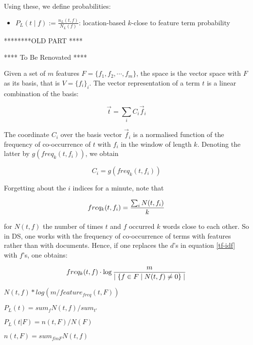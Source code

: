 Using  these, we define probabilities:

\begin{itemize}
\item $P_L(t \mid f) := \frac{n_L(t,f)}{N_L(f)}$: location-based $k$-close to feature term probability
\end{itemize}

********OLD PART ****

**** To Be Renovated ****

Given a set of $m$ features $F = \{f_1, f_2, \cdots, f_m\}$, the space is the vector space with $F$ as its basis, that is $V = \{f_i\}_i$. The vector representation of a term $t$ is a linear combination of the basis:

\begin{equation}
\label{vector-word}
\overrightarrow{t}  = \sum_i  C_i  \overrightarrow{f}_i
\end{equation}

The coordinate $C_i$ over the basis vector $\overrightarrow{f}_i$ is a normalised function of the frequency of co-occurrence of $t$ with $f_i$ in the window of length $k$. Denoting the latter by  $g(freq_k(t,f_i))$, we obtain 

\begin{equation}
C_i = g(freq_k(t,f_i))
\end{equation}

Forgetting about the $i$ indices for a minute, note that 

\begin{equation}
freq_k(t,f_i) = {{\sum_i N(t,f_i)} \over {k}}
\end{equation}

for $N(t, f)$ the number of times $t$ and $f$ occurred  $k$ words close to each other.  So in DS, one works with the frequency of co-occurrence of terms with features rather than with documents. Hence, if one replaces the $d$'s in equation \ref{tf-idf} with $f$'s, one obtains:

\begin{equation}
\label{f-for-d}
freq_k(t, f) \cdot \log{{m} \over {\mid \{f \in F \mid N(t,f)  \neq 0 \}\mid}}
\end{equation}


$N(t, f) * log ( m / feature_{freq} ( t, F ) )$


$P_L ( t ) = sum_f N( t, f)  /  sum_{ t' }$

$P_L ( t | F ) = n (t , F) / N ( F )$

$ n ( t , F ) = sum_{f in F} N(t, f)$


